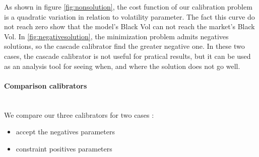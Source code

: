 \documentclass[a4paper,10pt]{article}
\begin{document}
As shown in figure \ref{fig:nonsolution}, the cost function of our calibration problem is a quadratic variation in relation to volatility parameter. The fact this curve do not reach zero show that the model's Black Vol can not reach the market's Black Vol. In \ref{fig:negativesolution}, the minimization problem admits negatives solutions, so the cascade calibrator find the greater negative one. In these two cases, the cascade calibrator is not useful for pratical results, but it can be used as an analysis tool for seeing when, and where the solution does not go well. 
\paragraph{Comparison calibrators} \mbox{} \\
We compare our three calibrators for two cases : 
\begin{itemize}
\item accept the negatives parameters
\item constraint positives parameters
\end{itemize} 
\end{document}
